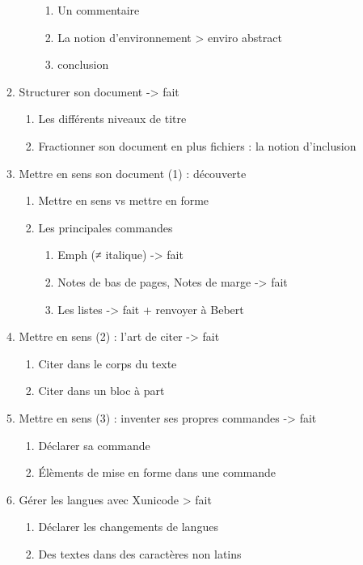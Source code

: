\begin{enumerate}
\begin{enumerate}
\begin{enumerate}
\begin{enumerate}
			\item Un commentaire
			\item La notion d'environnement			> enviro abstract
			\item conclusion	
		\end{enumerate}
	\end{enumerate} 
	\item{Structurer son document}						-> fait
		\begin{enumerate}	
		\item Les différents niveaux de titre
		\item Fractionner son document en plus fichiers : la notion d'inclusion
		\end{enumerate}
	\item Mettre en sens son document (1) : découverte
	\begin{enumerate}
		\item Mettre en sens vs mettre en forme
		\item Les principales commandes
		\begin{enumerate}
			\item Emph (≠ italique)					-> fait
			\item Notes de bas de pages, Notes de marge	-> fait
			\item Les listes						-> fait + renvoyer à Bebert
		\end{enumerate}
	\end{enumerate}
	\item Mettre en sens (2) : l'art de citer					-> fait
		\begin{enumerate}
		\item Citer dans le corps du texte	
		\item Citer dans un bloc à part
		\end{enumerate}
	\item Mettre en sens (3) : inventer ses propres commandes	-> fait
		\begin{enumerate}
		\item Déclarer sa commande
		\item Élèments de mise en forme dans une commande
		\end{enumerate}
	\item Gérer les langues avec Xunicode					 > fait
		\begin{enumerate}
		\item Déclarer les changements de langues
		\item Des textes dans des caractères non latins

\end{enumerate}
\end{enumerate}
\end{enumerate}
